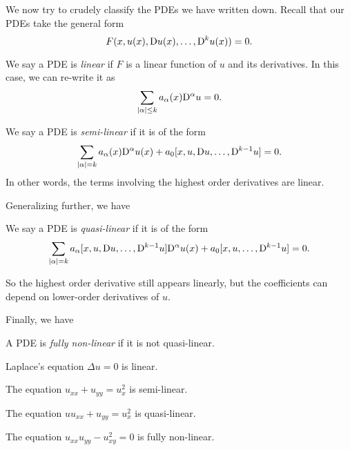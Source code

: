 \documentclass[a4paper]{article}
\begin{document}
We now try to crudely classify the PDEs we have written down. Recall that our PDEs take the general form
\[
  F(x, u(x), \mathrm{D} u(x), \ldots, \mathrm{D}^k u(x)) = 0.
\]

\begin{defi}
  We say a PDE is \emph{linear} if $F$ is a linear function of $u$ and its derivatives. In this case, we can re-write it as
  \[
    \sum_{|\alpha| \leq k} a_\alpha(x) \mathrm{D}^\alpha u = 0.
  \]
\end{defi}

\begin{defi}
  We say a PDE is \emph{semi-linear} if it is of the form
  \[
    \sum_{|\alpha| = k} a_\alpha(x) \mathrm{D}^\alpha u(x) + a_0[x, u, \mathrm{D} u, \ldots, \mathrm{D}^{k - 1} u] = 0.
  \]
  In other words, the terms involving the highest order derivatives are linear.
\end{defi}
Generalizing further, we have
\begin{defi}
  We say a PDE is \emph{quasi-linear} if it is of the form
  \[
    \sum_{|\alpha| = k} a_\alpha [x, u, \mathrm{D} u, \ldots, \mathrm{D}^{k - 1} u] \mathrm{D}^\alpha u(x) + a_0[x, u, \ldots, \mathrm{D}^{k - 1} u] = 0.
  \]
\end{defi}
So the highest order derivative still appears linearly, but the coefficients can depend on lower-order derivatives of $u$.

Finally, we have
\begin{defi}
  A PDE is \emph{fully non-linear} if it is not quasi-linear.
\end{defi}

\begin{eg}
  Laplace's equation $\Delta u = 0$ is linear.
\end{eg}

\begin{eg}
  The equation $u_{xx} + u_{yy} = u_x^2$ is semi-linear.
\end{eg}

\begin{eg}
  The equation $uu_{xx} + u_{yy} = u_x^2$ is quasi-linear.
\end{eg}

\begin{eg}
  The equation $u_{xx} u_{yy} - u_{xy}^2 = 0$ is fully non-linear.
\end{eg}
\end{document}
